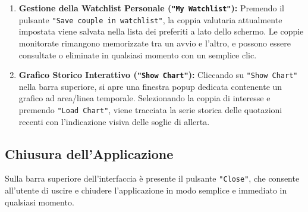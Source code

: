\documentclass[11pt,a4paper,openright]{report}
\begin{document}
\begin{enumerate}
  \item \textbf{Gestione della Watchlist Personale (\texttt{"My Watchlist"}):} Premendo il pulsante \texttt{"Save couple in watchlist"}, la coppia valutaria attualmente impostata viene salvata nella lista dei preferiti a lato dello schermo. Le coppie monitorate rimangono memorizzate tra un avvio e l'altro, e possono essere consultate o eliminate in qualsiasi momento con un semplice clic.
  \item \textbf{Grafico Storico Interattivo (\texttt{"Show Chart"}):} Cliccando su \texttt{"Show Chart"} nella barra superiore, si apre una finestra popup dedicata contenente un grafico ad area/linea temporale. Selezionando la coppia di interesse e premendo \texttt{"Load Chart"}, viene tracciata la serie storica delle quotazioni recenti con l'indicazione visiva delle soglie di allerta.
\end{enumerate}

\subsection*{Chiusura dell'Applicazione}
Sulla barra superiore dell'interfaccia è presente il pulsante \texttt{"Close"}, che consente all'utente di uscire e chiudere l'applicazione in modo semplice e immediato in qualsiasi momento.
\end{document}
